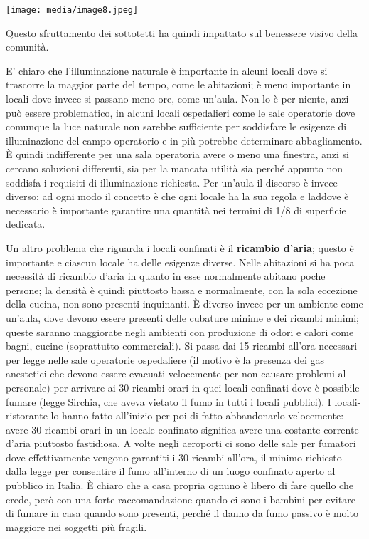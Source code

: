 \documentclass[]{article}
\begin{document}
\texttt{[image: media/image8.jpeg]}

Questo sfruttamento dei sottotetti ha quindi impattato sul benessere
visivo della comunità.

E' chiaro che l'illuminazione naturale è importante in alcuni locali
dove si trascorre la maggior parte del tempo, come le abitazioni; è meno
importante in locali dove invece si passano meno ore, come un'aula. Non
lo è per niente, anzi può essere problematico, in alcuni locali
ospedalieri come le sale operatorie dove comunque la luce naturale non
sarebbe sufficiente per soddisfare le esigenze di illuminazione del
campo operatorio e in più potrebbe determinare abbagliamento. È quindi
indifferente per una sala operatoria avere o meno una finestra, anzi si
cercano soluzioni differenti, sia per la mancata utilità sia perché
appunto non soddisfa i requisiti di illuminazione richiesta. Per un'aula
il discorso è invece diverso; ad ogni modo il concetto è che ogni locale
ha la sua regola e laddove è necessario è importante garantire una
quantità nei termini di 1/8 di superficie dedicata.

Un altro problema che riguarda i locali confinati è il \textbf{ricambio
d'aria}; questo è importante e ciascun locale ha delle esigenze diverse.
Nelle abitazioni si ha poca necessità di ricambio d'aria in quanto in
esse normalmente abitano poche persone; la densità è quindi piuttosto
bassa e normalmente, con la sola eccezione della cucina, non sono
presenti inquinanti. È diverso invece per un ambiente come un'aula, dove
devono essere presenti delle cubature minime e dei ricambi minimi;
queste saranno maggiorate negli ambienti con produzione di odori e
calori come bagni, cucine (soprattutto commerciali). Si passa dai 15
ricambi all'ora necessari per legge nelle sale operatorie ospedaliere
(il motivo è la presenza dei gas anestetici che devono essere evacuati
velocemente per non causare problemi al personale) per arrivare ai 30
ricambi orari in quei locali confinati dove è possibile fumare (legge
Sirchia, che aveva vietato il fumo in tutti i locali pubblici). I
locali-ristorante lo hanno fatto all'inizio per poi di fatto
abbandonarlo velocemente: avere 30 ricambi orari in un locale confinato
significa avere una costante corrente d'aria piuttosto fastidiosa. A
volte negli aeroporti ci sono delle sale per fumatori dove
effettivamente vengono garantiti i 30 ricambi all'ora, il minimo
richiesto dalla legge per consentire il fumo all'interno di un luogo
confinato aperto al pubblico in Italia. È chiaro che a casa propria
ognuno è libero di fare quello che crede, però con una forte
raccomandazione quando ci sono i bambini per evitare di fumare in casa
quando sono presenti, perché il danno da fumo passivo è molto maggiore
nei soggetti più fragili.
\end{document}
